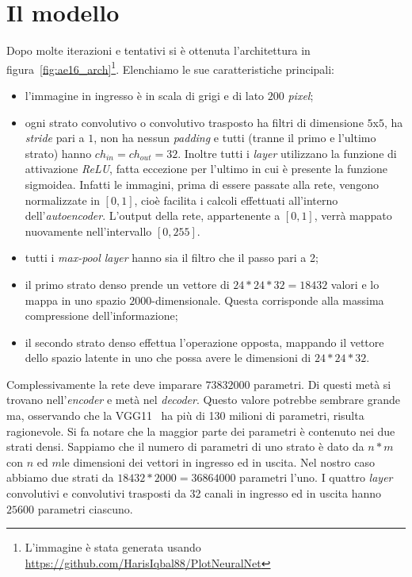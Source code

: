 \clearpage
\section{Il modello}
Dopo molte iterazioni e tentativi si è ottenuta l'architettura in figura~\ref{fig:ae16_arch}\footnote{L'immagine è stata generata usando \url{https://github.com/HarisIqbal88/PlotNeuralNet}}.
Elenchiamo le sue caratteristiche principali:
\begin{itemize}
  \item l'immagine in ingresso è in scala di grigi e di lato $200$ \textit{pixel};

  \item ogni strato convolutivo o convolutivo trasposto ha filtri di dimensione $5$x$5$, ha \textit{stride} pari a $1$, non ha nessun \textit{padding} e tutti (tranne il primo e l'ultimo strato) hanno $ch_{in}=ch_{out}=32$.
    Inoltre tutti i \textit{layer} utilizzano la funzione di attivazione \textit{ReLU}, fatta eccezione per l'ultimo in cui è presente la funzione sigmoidea.
    Infatti le immagini, prima di essere passate alla rete, vengono normalizzate in $[0,1]$, cioè facilita i calcoli effettuati all'interno dell'\textit{autoencoder}.
    L'output della rete, appartenente a $[0,1]$, verrà mappato nuovamente nell'intervallo $[0,255]$.

  \item tutti i \textit{max-pool layer} hanno sia il filtro che il passo pari a 2;

  \item il primo strato denso prende un vettore di $24*24*32=18432$ valori e lo mappa in uno spazio $2000$-dimensionale.
    Questa corrisponde alla massima compressione dell'informazione;

  \item il secondo strato denso effettua l'operazione opposta, mappando il vettore dello spazio latente in uno che possa avere le dimensioni di $24*24*32$.

\end{itemize}
Complessivamente la rete deve imparare  $73 832 000$ parametri.
Di questi metà si trovano nell'\textit{encoder} e metà nel \textit{decoder}.
Questo valore potrebbe sembrare grande ma, osservando che la VGG11~\cite{vgg} ha più di 130 milioni di parametri, risulta ragionevole.
Si fa notare che la maggior parte dei parametri è contenuto nei due strati densi.
Sappiamo che il numero di parametri di uno strato è dato da $n * m$ con $n$ ed $m$le dimensioni dei vettori in ingresso ed in uscita.
Nel nostro caso abbiamo due strati da $18432 * 2000 = 36 864 000$ parametri l'uno.
I quattro \textit{layer} convolutivi e convolutivi trasposti da 32 canali in ingresso ed in uscita hanno $25600$ parametri ciascuno.


